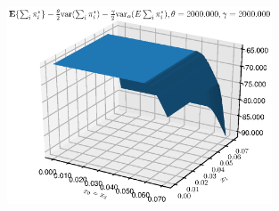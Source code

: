 \begin{figure}[htbp] %
   \centering
   \includegraphics[width=0.7\textwidth]{Figures/AToy/Atoy-FCP200000200000} 
\end{figure}

